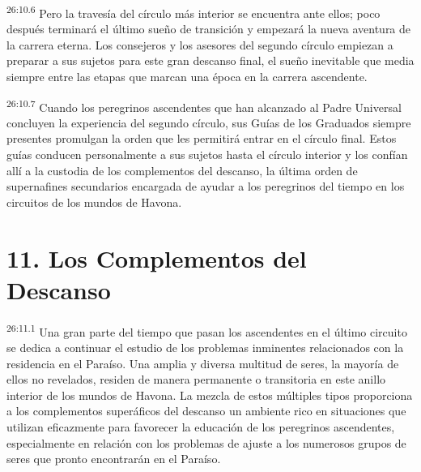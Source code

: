 \par
\textsuperscript{26:10.6} Pero la travesía del círculo más interior se encuentra ante ellos; poco después terminará el último sueño de transición y empezará la nueva aventura de la carrera eterna. Los consejeros y los asesores del segundo círculo empiezan a preparar a sus sujetos para este gran descanso final, el sueño inevitable que media siempre entre las etapas que marcan una época en la carrera ascendente.

\par
\textsuperscript{26:10.7} Cuando los peregrinos ascendentes que han alcanzado al Padre Universal concluyen la experiencia del segundo círculo, sus Guías de los Graduados siempre presentes promulgan la orden que les permitirá entrar en el círculo final. Estos guías conducen personalmente a sus sujetos hasta el círculo interior y los confían allí a la custodia de los complementos del descanso, la última orden de supernafines secundarios encargada de ayudar a los peregrinos del tiempo en los circuitos de los mundos de Havona.

\section*{11. Los Complementos del Descanso}
\par
\textsuperscript{26:11.1} Una gran parte del tiempo que pasan los ascendentes en el último circuito se dedica a continuar el estudio de los problemas inminentes relacionados con la residencia en el Paraíso. Una amplia y diversa multitud de seres, la mayoría de ellos no revelados, residen de manera permanente o transitoria en este anillo interior de los mundos de Havona. La mezcla de estos múltiples tipos proporciona a los complementos superáficos del descanso un ambiente rico en situaciones que utilizan eficazmente para favorecer la educación de los peregrinos ascendentes, especialmente en relación con los problemas de ajuste a los numerosos grupos de seres que pronto encontrarán en el Paraíso.

